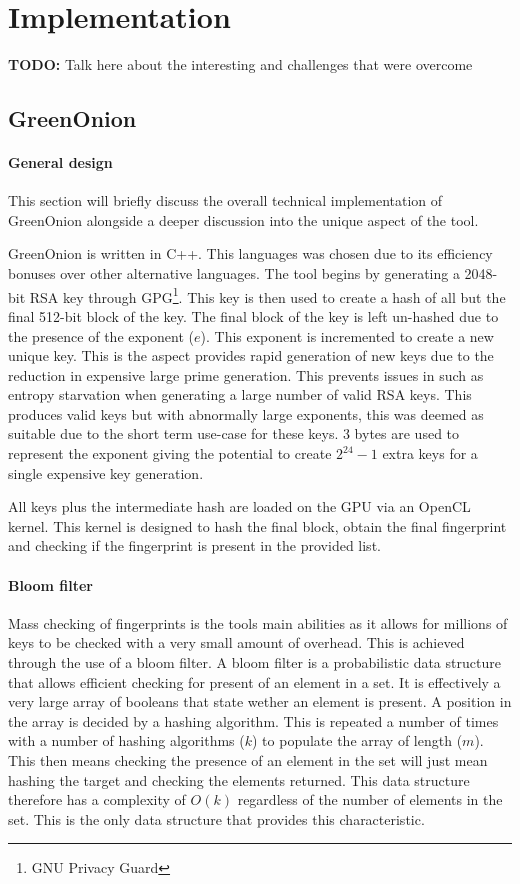 \chapter{Implementation}
\label{cha:Implementation}

\textbf{TODO: } Talk here about the interesting and challenges that were overcome

\section{GreenOnion}

\subsubsection{General design}
This section will briefly discuss the overall technical implementation of GreenOnion alongside a deeper discussion into the unique aspect of the tool.


GreenOnion is written in C++. This languages was chosen due to its efficiency bonuses over other alternative languages.
The tool begins by generating a 2048-bit RSA key through GPG\footnote{GNU Privacy Guard}. This key is then used to create a hash of all but the final 512-bit block of the key. The final block of the key is left un-hashed due to the presence of the exponent ($e$). This exponent is incremented to create a new unique key. This is the aspect provides rapid generation of new keys due to the reduction in expensive large prime generation. This prevents issues in such as entropy starvation when generating a large number of valid RSA keys. This produces valid keys but with abnormally large exponents, this was deemed as suitable due to the short term use-case for these keys. 3 bytes are used to represent the exponent giving the potential to create $2^{24} - 1$ extra keys for a single expensive key generation.

All keys plus the intermediate hash are loaded on the GPU via an OpenCL kernel. This kernel is designed to hash the final block, obtain the final fingerprint and checking if the fingerprint is present in the provided list.

\subsubsection{Bloom filter}

Mass checking of fingerprints is the tools main abilities as it allows for millions of keys to be checked with a very small amount of overhead. This is achieved through the use of a bloom filter. A bloom filter is a probabilistic data structure that allows efficient checking for present of an element in a set. It is effectively a very large array of booleans that state wether an element is present. A position in the array is decided by a hashing algorithm. This is repeated a number of times with a number of hashing algorithms ($k$) to populate the array of length ($m$). This then means checking the presence of an element in the set will just mean hashing the target and checking the elements returned. This data structure therefore has a complexity of $O(k)$ regardless of the number of elements in the set. This is the only data structure that provides this characteristic.

